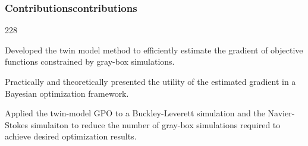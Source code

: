 \documentclass{beamer}
\newcommand{\barrow}{\item[\color{darkred}\ding{228}]}
\begin{document}
\begin{frame}
    \frametitle{Contributions\hfill \scriptsize{contributions}} \small
    \begin{dinglist}{228}


        \barrow Developed the twin model method to efficiently estimate the gradient of objective functions constrained by gray-box simulations.
                \vspace{.3cm}
        \barrow Practically and theoretically presented the utility of the estimated gradient in a Bayesian optimization framework.
                \vspace{.3cm}
        \barrow Applied the twin-model GPO to a Buckley-Leverett simulation and the Navier-Stokes simulaiton to reduce
                the number of gray-box simulations required to achieve desired optimization results.
    \end{dinglist}
\end{frame}
\end{document}
